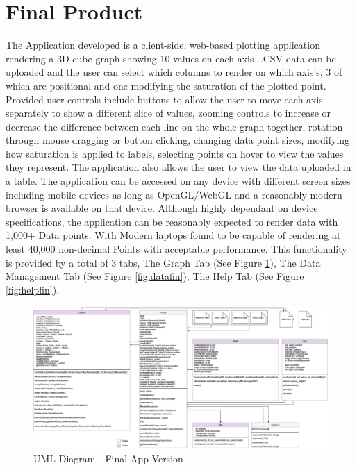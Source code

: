 \section{Final Product}
The Application developed is a client-side, web-based plotting application rendering a 3D cube graph showing 10 values on each axis- .CSV data can be uploaded and the user can select which columns to render on which axis's, 3 of which are positional and one modifying the saturation of the plotted point.
Provided user controls include buttons to allow the user to move each axis separately to show a different slice of values, zooming controls to increase or decrease the difference between each line on the whole graph together, rotation through mouse dragging or button clicking, changing data point sizes, modifying how saturation is applied to labels, selecting points on hover to view the values they represent. The application also allows the user to view the data uploaded in a table.
The application can be accessed on any device with different screen sizes including mobile devices as long as OpenGL/WebGL and a reasonably modern browser is available on that device. Although highly dependant on device specifications, the application can be reasonably expected to render data with 1,000+ Data points. With Modern laptops found to be capable of rendering at least 40,000 non-decimal Points with acceptable performance.
This functionality is provided by a total of 3 tabs, The Graph Tab (See Figure \ref{fig:graphfin}), The Data Management Tab (See Figure \ref{fig:datafin}), The Help Tab (See Figure \ref{fig:helpfin}).

\begin{figure}[h]
    \centering
    \includegraphics[width=1\textwidth]{author-files/figures/UML_All_fin.drawio.png}
    \caption{UML Diagram - Final App Version}
    \label{fig:graphfin}
\end{figure}
